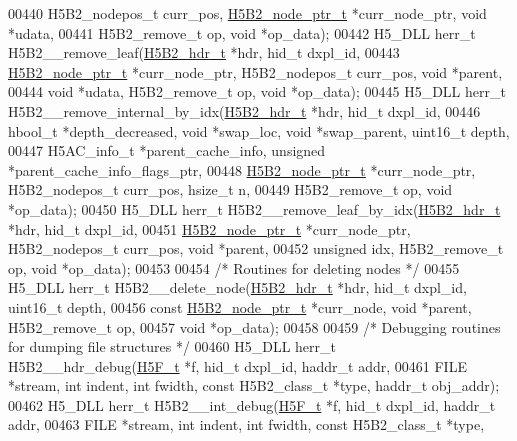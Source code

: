 \begin{DoxyCode}
{{00440     H5B2\_nodepos\_t curr\_pos, \hyperlink{struct_h5_b2__node__ptr__t}{H5B2\_node\_ptr\_t} *curr\_node\_ptr, \textcolor{keywordtype}{void} *udata,
00441     H5B2\_remove\_t op, \textcolor{keywordtype}{void} *op\_data);
00442 H5\_DLL herr\_t H5B2\_\_remove\_leaf(\hyperlink{struct_h5_b2__hdr__t}{H5B2\_hdr\_t} *hdr, hid\_t dxpl\_id,
00443     \hyperlink{struct_h5_b2__node__ptr__t}{H5B2\_node\_ptr\_t} *curr\_node\_ptr, H5B2\_nodepos\_t curr\_pos, \textcolor{keywordtype}{void} *parent,
00444     \textcolor{keywordtype}{void} *udata, H5B2\_remove\_t op, \textcolor{keywordtype}{void} *op\_data);
00445 H5\_DLL herr\_t H5B2\_\_remove\_internal\_by\_idx(\hyperlink{struct_h5_b2__hdr__t}{H5B2\_hdr\_t} *hdr, hid\_t dxpl\_id,
00446     hbool\_t *depth\_decreased, \textcolor{keywordtype}{void} *swap\_loc, \textcolor{keywordtype}{void} *swap\_parent, uint16\_t depth,
00447     H5AC\_info\_t *parent\_cache\_info, \textcolor{keywordtype}{unsigned} *parent\_cache\_info\_flags\_ptr,
00448     \hyperlink{struct_h5_b2__node__ptr__t}{H5B2\_node\_ptr\_t} *curr\_node\_ptr, H5B2\_nodepos\_t curr\_pos, hsize\_t n,
00449     H5B2\_remove\_t op, \textcolor{keywordtype}{void} *op\_data);
00450 H5\_DLL herr\_t H5B2\_\_remove\_leaf\_by\_idx(\hyperlink{struct_h5_b2__hdr__t}{H5B2\_hdr\_t} *hdr, hid\_t dxpl\_id,
00451     \hyperlink{struct_h5_b2__node__ptr__t}{H5B2\_node\_ptr\_t} *curr\_node\_ptr, H5B2\_nodepos\_t curr\_pos, \textcolor{keywordtype}{void} *parent,
00452     \textcolor{keywordtype}{unsigned} idx, H5B2\_remove\_t op, \textcolor{keywordtype}{void} *op\_data);
00453 
00454 \textcolor{comment}{/* Routines for deleting nodes */}
00455 H5\_DLL herr\_t H5B2\_\_delete\_node(\hyperlink{struct_h5_b2__hdr__t}{H5B2\_hdr\_t} *hdr, hid\_t dxpl\_id, uint16\_t depth,
00456     \textcolor{keyword}{const} \hyperlink{struct_h5_b2__node__ptr__t}{H5B2\_node\_ptr\_t} *curr\_node, \textcolor{keywordtype}{void} *parent, H5B2\_remove\_t op,
00457     \textcolor{keywordtype}{void} *op\_data);
00458 
00459 \textcolor{comment}{/* Debugging routines for dumping file structures */}
00460 H5\_DLL herr\_t H5B2\_\_hdr\_debug(\hyperlink{struct_h5_f__t}{H5F\_t} *f, hid\_t dxpl\_id, haddr\_t addr,
00461     FILE *stream, \textcolor{keywordtype}{int} indent, \textcolor{keywordtype}{int} fwidth, \textcolor{keyword}{const} H5B2\_class\_t *type, haddr\_t obj\_addr);
00462 H5\_DLL herr\_t H5B2\_\_int\_debug(\hyperlink{struct_h5_f__t}{H5F\_t} *f, hid\_t dxpl\_id, haddr\_t addr,
00463     FILE *stream, \textcolor{keywordtype}{int} indent, \textcolor{keywordtype}{int} fwidth, \textcolor{keyword}{const} H5B2\_class\_t *type,
}}
\end{DoxyCode}
